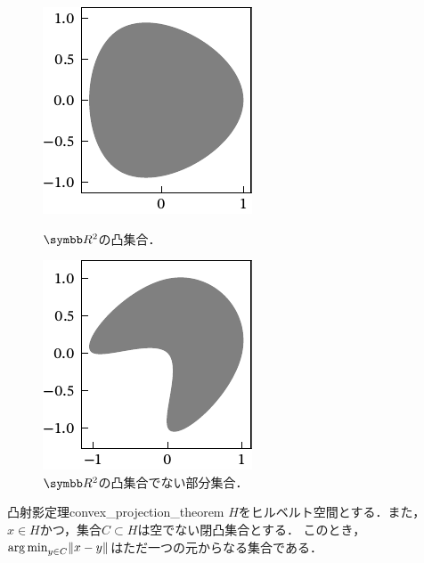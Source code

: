 \documentclass[../../main]{subfiles}
\begin{document}
\begin{figure}[htbp]
  \begin{minipage}{0.5\linewidth}
    \centering
    \includegraphics{figures/convex.pdf}
    \caption{\(\numset{R}^2\)の凸集合．}
  \end{minipage}%
  \begin{minipage}{0.5\linewidth}
    \centering
    \includegraphics{figures/non_convex.pdf}
    \caption{\(\numset{R}^2\)の凸集合でない部分集合．}
  \end{minipage}
\end{figure}

\begin{theorem}{凸射影定理}{convex_projection_theorem}
  \(H\)をヒルベルト空間とする．また，\(x\in H\)かつ，集合\(C\subset H\)は空でない閉凸集合とする．
  このとき，\(\operatorname*{arg\,min}_{y\in C}\lVert x-y\rVert\)はただ一つの元からなる集合である．
\end{theorem}
\end{document}
